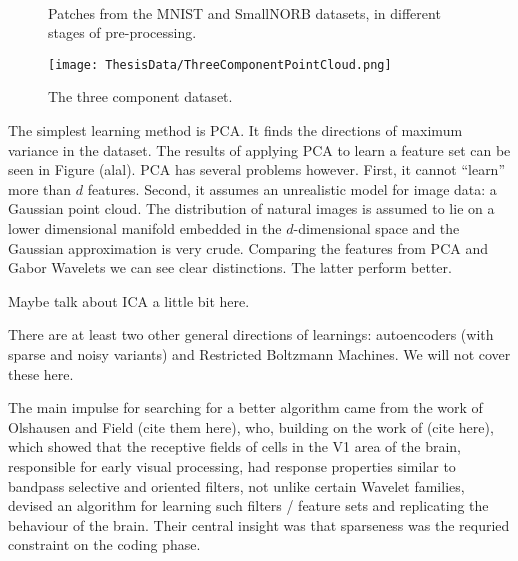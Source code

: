 \documentclass[12pt,a4paper,oneside,english]{UPBThesis}
\begin{document}
\begin{figure}
\centering
{}
~~~~~~
~~~~~~
~~~~~~
\caption{Patches from the MNIST and SmallNORB datasets, in different stages of pre-processing.}
\label{fig:Patches}
\end{figure}

\begin{figure}
\centering
\texttt{[image: ThesisData/ThreeComponentPointCloud.png]}
\caption{The three component dataset.}
\label{fig:ThreeComponentPointColud}
\end{figure}

The simplest learning method is PCA. It finds the directions of maximum variance in the dataset. The results of applying PCA to learn a feature set can be seen in Figure (alal). PCA has several problems however. First, it cannot ``learn'' more than $d$ features. Second, it assumes an unrealistic model for image data: a Gaussian point cloud. The distribution of natural images is assumed to lie on a lower dimensional manifold embedded in the $d$-dimensional space and the Gaussian approximation is very crude. Comparing the features from PCA and Gabor Wavelets we can see clear distinctions. The latter perform better.

Maybe talk about ICA a little bit here.

There are at least two other general directions of learnings: autoencoders (with sparse and noisy variants) and Restricted Boltzmann Machines. We will not cover these here.

The main impulse for searching for a better algorithm came from the work of Olshausen and Field (cite them here), who, building on the work of (cite here), which showed that the receptive fields of cells in the V1 area of the brain, responsible for early visual processing, had response properties similar to bandpass selective and oriented filters, not unlike certain Wavelet families, devised an algorithm for learning such filters / feature sets and replicating the behaviour of the brain. Their central insight was that sparseness was the requried constraint on the coding phase.
\end{document}
